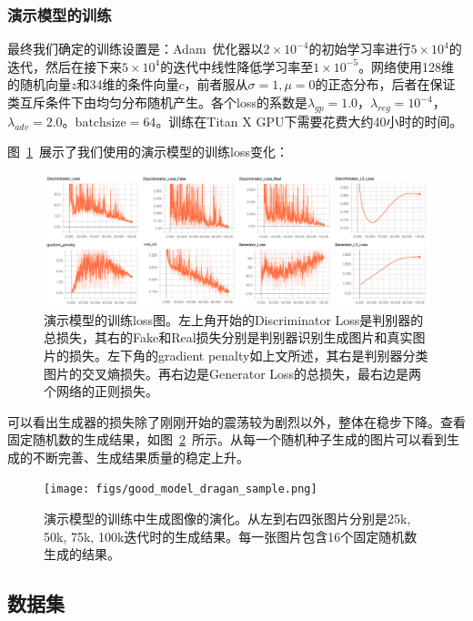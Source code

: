 \documentclass[a4paper,12pt,UTF8]{ctexart}
\newcommand{\kai}{\CJKfamily{zhkai}}	%
\begin{document}

\subsubsection{演示模型的训练}

最终我们确定的训练设置是：Adam~\cite{Kingma2014Adam}优化器以$2 \times 10^{-4}$的初始学习率进行$5 \times 10^{4}$的迭代，然后在接下来$5 \times 10^{4}$的迭代中线性降低学习率至$1 \times 10^{-5}$。网络使用128维的随机向量$z$和34维的条件向量$c$，前者服从$\sigma=1, \mu=0$的正态分布，后者在保证类互斥条件下由均匀分布随机产生。各个loss的系数是$\lambda_{gp}=1.0$，$\lambda_{reg}=10^{-4}$，$\lambda_{adv}=2.0$。$\mathrm{batchsize}=64$。训练在Titan X GPU下需要花费大约40小时的时间。

图~\ref{fig:goodmodel_dragan}~展示了我们使用的演示模型的训练loss变化：

\begin{figure}[H]
  \centering
  \includegraphics[width=1\linewidth]{figs/good_model_dragan.png}
  \caption{\kai 演示模型的训练loss图。左上角开始的Discriminator Loss是判别器的总损失，其右的Fake和Real损失分别是判别器识别生成图片和真实图片的损失。左下角的gradient penalty如上文所述，其右是判别器分类图片的交叉熵损失。再右边是Generator Loss的总损失，最右边是两个网络的正则损失。}
  \label{fig:goodmodel_dragan}
\end{figure}

可以看出生成器的损失除了刚刚开始的震荡较为剧烈以外，整体在稳步下降。查看固定随机数的生成结果，如图~\ref{fig:dragan_evolve}~所示。从每一个随机种子生成的图片可以看到生成的不断完善、生成结果质量的稳定上升。

\begin{figure}[H]
  \centering
  \texttt{[image: figs/good\_model\_dragan\_sample.png]}
  \caption{\kai 演示模型的训练中生成图像的演化。从左到右四张图片分别是25k, 50k, 75k, 100k迭代时的生成结果。每一张图片包含16个固定随机数生成的结果。}
  \label{fig:dragan_evolve}
\end{figure}

\subsection{数据集}
\end{document}
